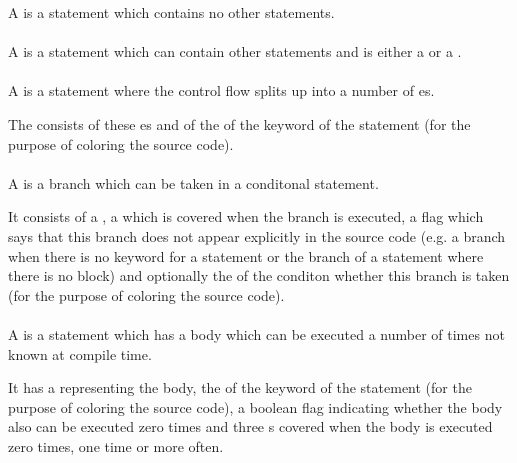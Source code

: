 A  is a statement which contains no other statements.

\paragraph{}

A  is a statement which can contain other statements and
is either a  or a .

\paragraph{}

A  is a statement where the control flow splits up
into a number of es.

The  consists of these es and of the
 of the keyword of the statement (for the purpose of
coloring the source code). %

\paragraph{}

A  is a branch which can be taken in a conditonal statement.

It consists of a ,
a  which is covered when the branch
is executed, a flag which says that this branch does not appear explicitly
in the source code (e.g. a  branch when there is no 
keyword for a  statement or the  branch of a
 statement where there is no  block) and 
optionally the  of the conditon whether this branch is taken
(for the purpose of coloring the source code).

\paragraph{}

A  is a statement which has a body which can be executed
a number of times not known at compile time.

It has a  representing the body, the 
of the keyword of the statement (for the purpose of coloring the source code),
a boolean flag indicating whether the body also can be executed zero times
and three s covered when the body is executed zero times,
one time or more often.

